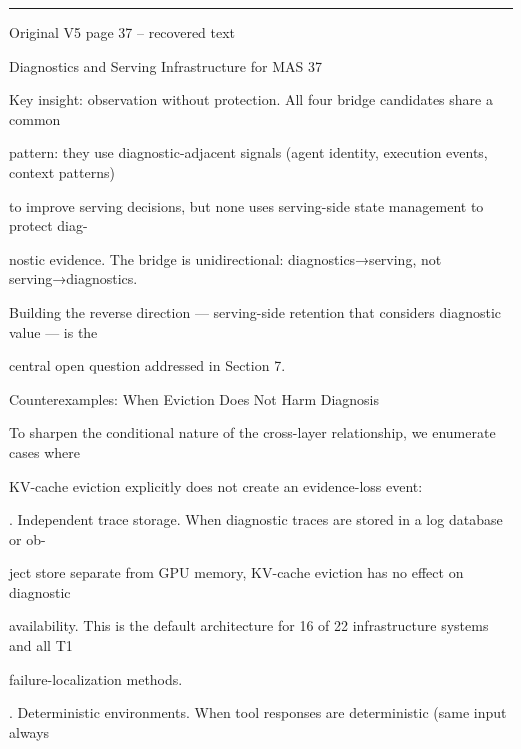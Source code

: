 \par\smallskip\noindent\rule{\textwidth}{0.4pt}\par{\sffamily\footnotesize Original V5 page 37 -- recovered text}\par\begin{flushleft}\footnotesize\ttfamily
\par\smallskip
\par\smallskip
\noindent Diagnostics and Serving Infrastructure for MAS 37\par
\par\smallskip
\par\smallskip
\par\smallskip
\noindent Key insight: observation without protection. All four bridge candidates share a common\par
\noindent pattern: they use diagnostic-adjacent signals (agent identity, execution events, context patterns)\par
\noindent to improve serving decisions, but none uses serving-side state management to protect diag-\par
\noindent nostic evidence. The bridge is unidirectional: diagnostics→serving, not serving→diagnostics.\par
\noindent Building the reverse direction — serving-side retention that considers diagnostic value — is the\par
\noindent central open question addressed in Section 7.\par
\par\smallskip
{} Counterexamples: When Eviction Does Not Harm Diagnosis\par
\noindent To sharpen the conditional nature of the cross-layer relationship, we enumerate cases where\par
\noindent KV-cache eviction explicitly does not create an evidence-loss event:\par
{}. Independent trace storage. When diagnostic traces are stored in a log database or ob-\par
\noindent  ject store separate from GPU memory, KV-cache eviction has no effect on diagnostic\par
\noindent  availability. This is the default architecture for 16 of 22 infrastructure systems and all T1\par
\noindent  failure-localization methods.\par
{}. Deterministic environments. When tool responses are deterministic (same input always\par

\end{flushleft}
